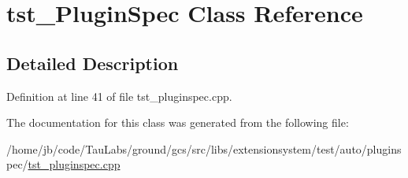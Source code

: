 \hypertarget{classtst___plugin_spec}{\section{tst\-\_\-\-Plugin\-Spec \-Class \-Reference}
\label{classtst___plugin_spec}
}


\subsection{\-Detailed \-Description}


\-Definition at line 41 of file tst\-\_\-pluginspec.\-cpp.



\-The documentation for this class was generated from the following file\-:\begin{DoxyCompactItemize}
\item 
/home/jb/code/\-Tau\-Labs/ground/gcs/src/libs/extensionsystem/test/auto/pluginspec/\hyperlink{tst__pluginspec_8cpp}{tst\-\_\-pluginspec.\-cpp}\end{DoxyCompactItemize}
